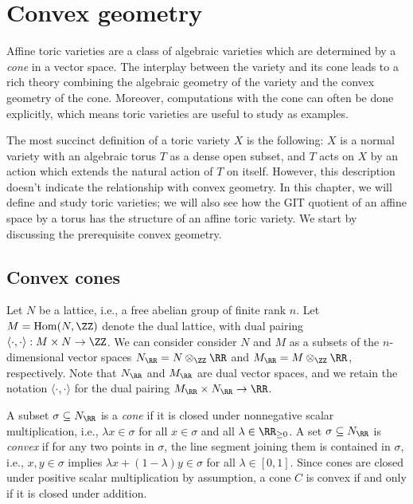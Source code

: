 \documentclass[12pt]{amsart}
\theoremstyle{plain}
\begin{document}
\section{Convex geometry}\label{sectionconvexgeometry}
Affine toric varieties are a class of algebraic varieties which are determined by a \emph{cone} in a vector space.
The interplay between the variety and its cone leads to a rich theory combining the algebraic geometry of the variety and the convex geometry of the cone.
Moreover, computations with the cone can often be done explicitly, which means toric varieties are useful to study as examples.

The most succinct definition of a toric variety $X$ is the following:
$X$ is a normal variety with an algebraic torus $T$ as a dense open subset, and $T$ acts on $X$ by an action which extends the natural action of $T$ on itself.
However, this description doesn't indicate the relationship with convex geometry.
In this chapter, we will define and study toric varieties; we will also see how the GIT quotient of an affine space by a torus has the structure of an affine toric variety.
We start by discussing the prerequisite convex geometry.

\subsection{Convex cones}
Let $N$ be a lattice, i.e., a free abelian group of finite rank $n$.
Let $M = \mathrm{Hom}(N, \ZZ)$ denote the dual lattice, with dual pairing $\langle \cdot, \cdot \rangle : M \times N \to \ZZ$.
We can consider consider $N$ and $M$ as a subsets of the $n$-dimensional vector spaces
$N_\RR = N \otimes_\ZZ \RR$ and $M_\RR = M \otimes_\ZZ \RR$, respectively.
Note that $N_\RR$ and $M_\RR$ are dual vector spaces, and we retain the notation $\langle \cdot, \cdot \rangle$ for the dual pairing $M_\RR \times N_\RR \to \RR$.

A subset $\sigma \subseteq N_\RR$ is a \emph{cone} if it is closed under nonnegative scalar multiplication, i.e., $\lambda x \in \sigma$ for all $x \in \sigma$ and all $\lambda \in \RR_{\ge 0}$.
A set $\sigma \subseteq N_\RR$ is \emph{convex} if for any two points in $\sigma$, the line segment joining them is contained in $\sigma$,
i.e., $x, y \in \sigma$ implies $\lambda x + (1 - \lambda) y \in \sigma$ for all $\lambda \in [0, 1]$.
Since cones are closed under positive scalar multiplication by assumption, a cone $C$ is convex if and only if it is closed under addition.
\end{document}
